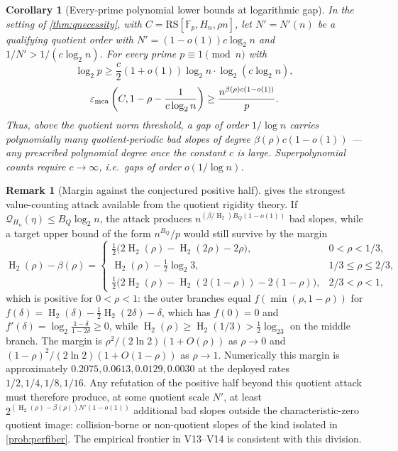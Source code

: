 \documentclass[11pt]{article}
\newtheorem{corollary}[corollary]{Corollary}
\theoremstyle{definition}
\newtheorem{remark}[remark]{Remark}
\newcommand{\F}{\mathbb F}
\newcommand{\eps}{\varepsilon}
\newcommand{\HH}{\operatorname{H}_2}
\newcommand{\RS}{\mathrm{RS}}
\newcommand{\emca}{\eps_{\rm mca}}
\begin{document}
\begin{corollary}[Every-prime polynomial lower bounds at logarithmic gap]\label{cor:logfailure}
In the setting of \cref{thm:qnecessity}, with $C=\RS[\F_p,H_n,\rho n]$, let $N'=N'(n)$ be a qualifying quotient order with $N'=(1-o(1))c\log_2 n$ and $1/N'>1/(c\log_2 n)$.  For every prime $p\equiv1\pmod n$ with
\[
        \log_2p\ge \frac c2(1+o(1))\log_2 n\cdot\log_2(c\log_2 n),
\]
\[
        \emca\left(C,1-\rho-\frac1{c\log_2n}\right)
        \ge
        \frac{n^{\beta(\rho)c(1-o(1))}}{p}.
\]
Thus, above the quotient norm threshold, a gap of order $1/\log n$ carries polynomially many quotient-periodic bad slopes of degree $\beta(\rho)c(1-o(1))$ --- any prescribed polynomial degree once the constant $c$ is large.  Superpolynomial counts require $c\to\infty$, i.e.\ gaps of order $o(1/\log n)$.
\end{corollary}

\begin{remark}[Margin against the conjectured positive half]\label{rem:margin}
 gives the strongest value-counting attack available from the quotient rigidity theory.  If $\mathcal Q_{H_n}(\eta)\le B_Q\log_2 n$, the attack produces $n^{(\beta/\HH)B_Q(1-o(1))}$ bad slopes, while a target upper bound of the form $n^{B_Q}/p$ would still survive by the margin
\[
        \HH(\rho)-\beta(\rho)=
        \begin{cases}
        \frac12\bigl(2\HH(\rho)-\HH(2\rho)-2\rho\bigr), & 0<\rho<1/3,\\[1mm]
        \HH(\rho)-\frac12\log_2 3, & 1/3\le\rho\le 2/3,\\[1mm]
        \frac12\bigl(2\HH(\rho)-\HH(2(1-\rho))-2(1-\rho)\bigr), & 2/3<\rho<1,
        \end{cases}
\]
which is positive for $0<\rho<1$: the outer branches equal $f(\min(\rho,1-\rho))$ for $f(\delta)=\HH(\delta)-\frac12\HH(2\delta)-\delta$, which has $f(0)=0$ and $f'(\delta)=\log_2\frac{1-\delta}{1-2\delta}\ge0$, while $\HH(\rho)\ge\HH(1/3)>\frac12\log_23$ on the middle branch.  The margin is $\rho^2/(2\ln2)(1+O(\rho))$ as $\rho\to0$ and $(1-\rho)^2/(2\ln2)(1+O(1-\rho))$ as $\rho\to1$.  Numerically this margin is approximately $0.2075,0.0613,0.0129,0.0030$ at the deployed rates $1/2,1/4,1/8,1/16$.  Any refutation of the positive half beyond this quotient attack must therefore produce, at some quotient scale $N'$, at least $2^{(\HH(\rho)-\beta(\rho))N'(1-o(1))}$ additional bad slopes outside the characteristic-zero quotient image: collision-borne or non-quotient slopes of the kind isolated in \cref{prob:perfiber}.  The empirical frontier in V13--V14 is consistent with this division.
\end{remark}
\end{document}
